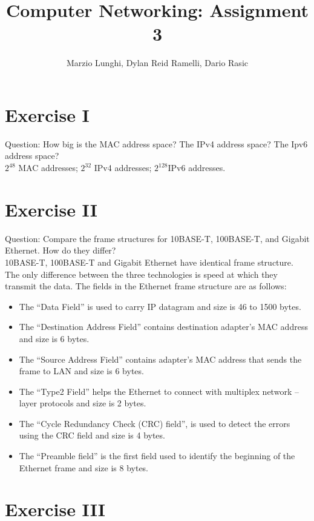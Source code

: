 \documentclass[11pt]{article}
\title{Computer Networking: Assignment 3}
\author{Marzio Lunghi, Dylan Reid Ramelli, Dario Rasic}
\begin{document}
	\maketitle
	\newpage
	\section*{Exercise I}
	Question: How big is the MAC address space? The IPv4 address space? The Ipv6 address space?\\
	\linebreak
	$2^{48}$ MAC addresses; $2^{32}$ IPv4 addresses; $2^{128}$IPv6 addresses.

	\section*{Exercise II}
	Question: Compare the frame structures for 10BASE-T, 100BASE-T,
	and Gigabit Ethernet. How do they differ?\\
	\linebreak
	10BASE-T, 100BASE-T and Gigabit Ethernet have identical frame structure.
	The only difference between the three technologies is speed at which they transmit the data.
	The fields in the Ethernet frame structure are as follows:
	\begin{itemize}
		\item The “Data Field” is used to carry IP datagram and size is 46 to 1500 bytes.
		\item 	The “Destination Address Field” contains destination adapter’s MAC address and size is 6 bytes.
		\item 	The “Source Address Field” contains adapter’s MAC address that sends the frame to LAN and size is 6 bytes.
		\item 	The “Type2 Field” helps the Ethernet to connect with multiplex network – layer protocols and size is 2 bytes.
		\item The “Cycle Redundancy Check (CRC) field”, is used to detect the errors using the CRC field and size is 4 bytes.
		\item 	The “Preamble field” is the first field used to identify the beginning of the Ethernet frame and size is 8 bytes.
	\end{itemize}

	\section*{Exercise III}
\end{document}

